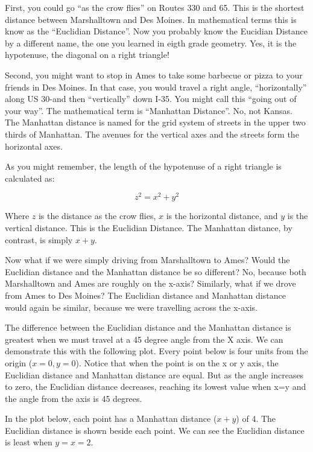\documentclass[
]{book}
\begin{document}
First, you could go ``as the crow flies'' on Routes 330 and 65. This is the shortest distance between Marshalltown and Des Moines. In mathematical terms this is know as the ``Euclidian Distance''. Now you probably know the Eucidian Distance by a different name, the one you learned in eigth grade geometry. Yes, it is the hypotenuse, the diagonal on a right triangle!

Second, you might want to stop in Ames to take some barbecue or pizza to your friends in Des Moines. In that case, you would travel a right angle, ``horizontally'' along US 30-and then ``vertically'' down I-35. You might call this ``going out of your way''. The mathematical term is ``Manhattan Distance''. No, not Kansas. The Manhattan distance is named for the grid system of streets in the upper two thirds of Manhattan. The avenues for the vertical axes and the streets form the horizontal axes.

As you might remember, the length of the hypotenuse of a right triangle is calculated as:

\[z^2 = x^2 + y^2\]

Where \(z\) is the distance as the crow flies, \(x\) is the horizontal distance, and \(y\) is the vertical distance. This is the Euclidian Distance. The Manhattan distance, by contrast, is simply \(x + y\).

Now what if we were simply driving from Marshalltown to Ames? Would the Euclidian distance and the Manhattan distance be so different? No, because both Marshalltown and Ames are roughly on the x-axis? Similarly, what if we drove from Ames to Des Moines? The Euclidian distance and Manhattan distance would again be similar, because we were travelling across the x-axis.

The difference between the Euclidian distance and the Manhattan distance is greatest when we must travel at a 45 degree angle from the X axis. We can demonstrate this with the following plot. Every point below is four units from the origin (\(x=0,y=0\)). Notice that when the point is on the x or y axis, the Euclidian distance and Manhattan distance are equal. But as the angle increases to zero, the Euclidian distance decreases, reaching its lowest value when x=y and the angle from the axis is 45 degrees.

In the plot below, each point has a Manhattan distance (\(x+y\)) of 4. The Euclidian distance is shown beside each point. We can see the Euclidian distance is least when \(y=x=2\).
\end{document}
